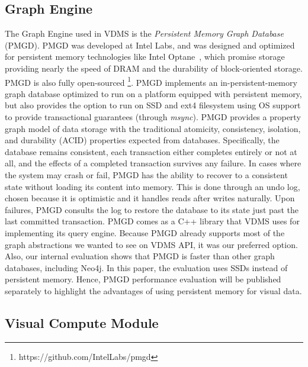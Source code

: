 \subsection{Graph Engine}

The Graph Engine used in VDMS is the
\textit{Persistent Memory Graph Database} (PMGD).
PMGD was developed at Intel Labs, and was designed and optimized for
persistent memory technologies like Intel Optane~\cite{IntelXPoint15}, which
promise storage providing nearly the speed of DRAM and the
durability of block-oriented storage.
PMGD is also fully open-sourced \footnote{https://github.com/IntelLabs/pmgd}.
PMGD implements an in-persistent-memory graph database optimized
to run on a platform equipped with persistent memory, but
also provides the option to run on SSD and ext4 filesystem
using OS support to provide transactional guarantees (through \textit{msync}).
PMGD provides a property graph model of data storage with the traditional
atomicity, consistency, isolation, and durability
(ACID) properties expected from databases.
Specifically, the database remains consistent, each transaction either
completes entirely or not at all, and the effects of a completed transaction
survives any failure.
In cases where the system may crash or fail, PMGD has the ability
to recover to a consistent state without loading its content into memory.
This is done through an undo log, chosen because it is optimistic and
it handles reads after writes naturally.
Upon failures, PMGD consults the log to restore the database
to its state just past the last committed transaction.
PMGD comes as a C++ library that VDMS uses for implementing its query engine.
Because PMGD already supports most of the graph abstractions we wanted
to see on VDMS API, it was our preferred option.
Also, our internal evaluation shows that PMGD is faster
than other graph databases, including Neo4j\cite{miller2013graph}.
In this paper, the evaluation uses SSDs instead of persistent memory.
Hence, PMGD performance evaluation will be published separately to highlight
the advantages of using persistent memory for visual data.

\subsection{Visual Compute Module}


